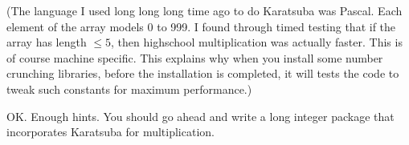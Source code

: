 (The language I used long long long time ago to do Karatsuba
was Pascal.
Each element of the array models 0 to 999.
I found through timed testing that if the array has length $\leq 5$,
then highschool multiplication was actually faster.
This is of course machine specific.
This explains why when you install some number crunching libraries,
before the installation is completed, it will tests the code to tweak
such constants for maximum performance.)

OK. 
Enough hints.
You should go ahead and write a long integer package that 
incorporates 
Karatsuba for multiplication.






